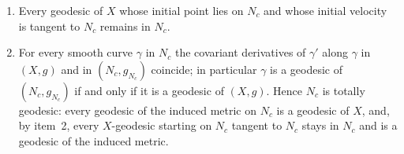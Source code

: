 \begin{lemma}
\begin{enumerate}
with image contained in $N_c$ is smooth as a map into $N_c$.
\item Every geodesic of $X$ whose initial point lies on $N_c$ and whose
initial velocity is tangent to $N_c$ remains in $N_c$.
\item For every smooth curve $\gamma$ in $N_c$ the covariant derivatives
of $\gamma'$ along $\gamma$ in $(X,g)$ and in $(N_c,g_{N_c})$ coincide;
in particular $\gamma$ is a geodesic of $(N_c,g_{N_c})$ if and only if
it is a geodesic of $(X,g)$. Hence $N_c$ is totally geodesic: every
geodesic of the induced metric on $N_c$ is a geodesic of $X$, and, by
item~2, every $X$-geodesic starting on $N_c$ tangent to $N_c$ stays in
$N_c$ and is a geodesic of the induced metric.
\end{enumerate}
\end{lemma}

